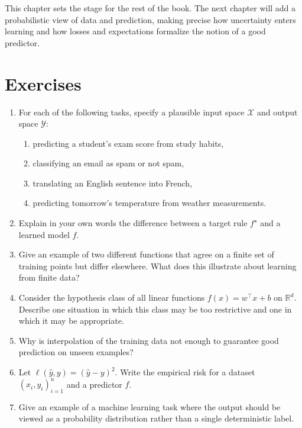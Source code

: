 This chapter sets the stage for the rest of the book. The next chapter will add a probabilistic view of data and prediction, making precise how uncertainty enters learning and how losses and expectations formalize the notion of a good predictor.

\section{Exercises}

\begin{enumerate}
    \item For each of the following tasks, specify a plausible input space $\mathcal{X}$ and output space $\mathcal{Y}$:
    \begin{enumerate}
        \item predicting a student's exam score from study habits,
        \item classifying an email as spam or not spam,
        \item translating an English sentence into French,
        \item predicting tomorrow's temperature from weather measurements.
    \end{enumerate}

    \item Explain in your own words the difference between a target rule $f^\star$ and a learned model $f$.

    \item Give an example of two different functions that agree on a finite set of training points but differ elsewhere. What does this illustrate about learning from finite data?

    \item Consider the hypothesis class of all linear functions $f(x)=w^\top x+b$ on $\mathbb{R}^d$. Describe one situation in which this class may be too restrictive and one in which it may be appropriate.

    \item Why is interpolation of the training data not enough to guarantee good prediction on unseen examples?

    \item Let $\ell(\hat y,y)=(\hat y-y)^2$. Write the empirical risk for a dataset $(x_i,y_i)_{i=1}^n$ and a predictor $f$.

    \item Give an example of a machine learning task where the output should be viewed as a probability distribution rather than a single deterministic label.


\end{enumerate}
